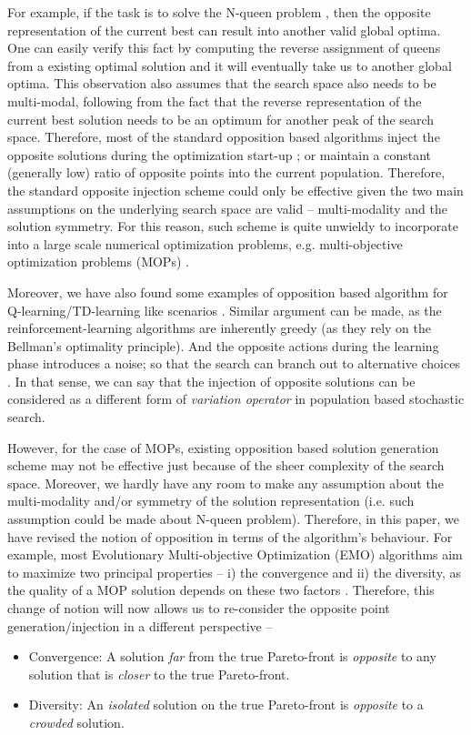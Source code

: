 \documentclass[journal]{IEEEtran}
\begin{document}
For example, if the task is to solve the N-queen problem \cite{?}, then the opposite representation of the current best can result into another valid global optima. One can easily verify this fact by computing the reverse assignment of queens from a existing optimal solution and it will eventually take us to another global optima. This observation also assumes that the search space also needs to be multi-modal, following from the fact that the reverse representation of the current best solution needs to be an optimum for another peak of the search space. Therefore, most of the standard opposition based algorithms inject the opposite solutions during the optimization start-up \cite{?}; or maintain a constant (generally low) ratio of opposite points \cite{?} into the current population. Therefore, the standard opposite injection scheme could only be effective given the two main assumptions on the underlying search space are valid -- multi-modality and the solution symmetry. For this reason, such scheme is quite unwieldy to incorporate into a large scale numerical optimization problems, e.g. multi-objective optimization problems (MOPs) \cite{?}.

Moreover, we have also found some examples of opposition based algorithm for Q-learning/TD-learning like scenarios \cite{?}. Similar argument can be made, as the reinforcement-learning algorithms are inherently greedy \cite{?} (as they rely on the Bellman's optimality principle). And the opposite actions during the learning phase introduces a noise; so that the search can branch out to alternative choices \cite{?}. In that sense, we can say that the injection of opposite solutions can be considered as a different form of \textit{variation operator} in population based stochastic search. 

However, for the case of MOPs, existing opposition based solution generation scheme may not be effective just because of the sheer complexity of the search space. Moreover, we hardly have any room to make any assumption about the multi-modality and/or symmetry of the solution representation (i.e. such assumption could be made about N-queen problem). Therefore, in this paper, we have revised the notion of opposition in terms of the algorithm's behaviour. For example, most Evolutionary Multi-objective Optimization (EMO) algorithms aim to maximize two principal properties -- i) the convergence and ii) the diversity, as the quality of a MOP solution depends on these two factors \cite{?}. Therefore, this change of notion will now allows us to re-consider the opposite point generation/injection in a different perspective --
\begin{itemize}
	\item Convergence: A solution \textit{far} from the true Pareto-front is \textit{opposite} to any solution that is \textit{closer} to the true Pareto-front.
	\item Diversity: An \textit{isolated} solution on the true Pareto-front is \textit{opposite} to a \textit{crowded} solution. 
\end{itemize}
\end{document}
